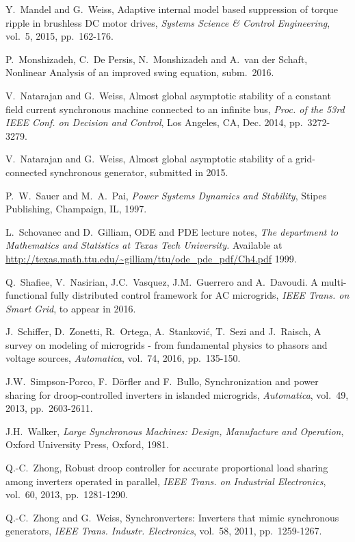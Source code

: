 \documentclass[letterpaper,10pt,conference]{ieeeconf}
\newcommand{\m}      {{\hbox{\hskip 1pt}}}
\begin{document}
\begin{thebibliography}{99}
 Y.~Mandel and G.~Weiss, \m Adaptive internal model based
 suppression of torque ripple in brushless DC motor drives, {\em
 Systems Science \& Control Engineering}, vol.~5, 2015, pp.~162-176.

 P.~Monshizadeh, C.~De Persis,
 N.~Monshizadeh and A.~van der Schaft, \m Nonlinear Analysis
 of an improved swing equation, \m subm.~2016.

 V.~Natarajan and G.~Weiss, \m Almost global 
 asymptotic stability of a constant field current synchronous 
 machine connected to an infinite bus, {\em Proc. of the 53rd 
 IEEE Conf. on Decision and Control}, Los Angeles, CA, Dec. 2014, 
 pp.~3272-3279.

 V.~Natarajan and G.~Weiss, \m Almost global 
 asymptotic stability of a grid-connected synchronous generator,
 submitted in 2015.


 P.~W.~Sauer and M.~A.~Pai, \m {\em Power 
 Systems Dynamics and Stability}, Stipes Publishing, Champaign,
 IL, 1997.

 L.~Schovanec and D.~Gilliam, \m ODE
 and PDE lecture notes, {\em The department to Mathematics and 
 Statistics at Texas Tech University.} Available at
 \url{http://texas.math.ttu.edu/~gilliam/ttu/ode_pde_pdf/Ch4.pdf}
 \m 1999.
  
 Q.~Shafiee, V.~Nasirian, J.C.~Vasquez, 
 J.M.~Guerrero and A.~Davoudi. \m A multi-functional fully 
 distributed control framework for AC microgrids, {\em 
 IEEE Trans. on Smart Grid}, to appear in 2016.

 J.~Schiffer, D.~Zonetti, R.~Ortega,
 A.~Stankovi{\'c}, T.~Sezi  and J.~Raisch, \m A survey on modeling
 of microgrids - from fundamental physics to phasors and voltage 
 sources, {\em Automatica}, vol.~74, 2016, pp.~135-150.

 J.W.~Simpson-Porco, F.~D{\"o}rfler
 and F.~Bullo, \m Synchronization and power sharing for
 droop-controlled inverters in islanded microgrids, {\em 
 Automatica}, vol.~49, 2013, pp.~2603-2611.

 J.H.~Walker, \m {\em Large Synchronous Machines: 
 Design, Manufacture and Operation}, \m Oxford University Press, 
 Oxford, 1981.

 Q.-C.~Zhong, \m Robust droop controller for 
 accurate proportional load sharing among inverters operated in 
 parallel, {\em IEEE Trans. on Industrial Electronics}, vol.~60,
 2013, pp.~1281-1290.

 Q.-C.~Zhong and G.~Weiss, \m Synchronverters: 
 Inverters that mimic synchronous generators, {\em IEEE Trans. 
 Industr. Electronics}, vol.~58, 2011, pp.~1259-1267.

\end{thebibliography}
\end{document}
